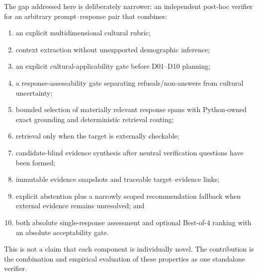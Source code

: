 The gap addressed here is deliberately narrower: an independent post-hoc verifier for an arbitrary prompt--response pair that combines:
\begin{enumerate}
    \item an explicit multidimensional cultural rubric;
    \item context extraction without unsupported demographic inference;
    \item an explicit cultural-applicability gate before D01--D10 planning;
    \item a response-assessability gate separating refusals/non-answers from cultural uncertainty;
    \item bounded selection of materially relevant response spans with Python-owned exact grounding and deterministic retrieval routing;
    \item retrieval only when the target is externally checkable;
    \item candidate-blind evidence synthesis after neutral verification questions have been formed;
    \item immutable evidence snapshots and traceable target--evidence links;
    \item explicit abstention plus a narrowly scoped recommendation fallback when external evidence remains unresolved; and
    \item both absolute single-response assessment and optional Best-of-4 ranking with an absolute acceptability gate.
\end{enumerate}

This is not a claim that each component is individually novel. The contribution is the combination and empirical evaluation of these properties as one standalone verifier.
